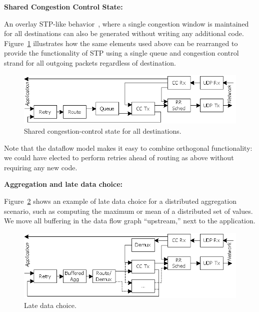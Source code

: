 \documentclass[10pt,twocolumn]{article}
\renewcommand{\subsection}[1]{\vspace{10pt}\noindent\textbf{#1:}\vspace{5pt}}
\begin{document}
\subsection{Shared Congestion Control State}

An overlay STP-like behavior~\cite{dabek_nsdi04}, where a single
congestion window is maintained for all destinations can also be
generated without writing any additional code.  Figure~\ref{fig:STP}
illustrates how the same elements used above can be rearranged to
provide the functionality of STP using a single queue and congestion
control strand for all outgoing packets regardless of destination.

\begin{figure}
\centerline{\includegraphics{STP}}
\caption{Shared congestion-control state for all destinations.}
\label{fig:STP}
\end{figure}

Note that the dataflow model makes it easy to combine orthogonal
functionality: we could have elected to perform retries ahead of
routing as above without requiring any new code. 

\subsection{Aggregation and late data choice}

Figure~\ref{fig:BufferedAggregation} shows an example of late data
choice for a distributed aggregation scenario, such as computing
the maximum or mean of a distributed set of values.  We move all
buffering in the data flow graph ``upstream,'' next to the
application. 

\begin{figure}
\centerline{\includegraphics{BufferedAggregationRetries}}
\caption{Late data choice.}
\label{fig:BufferedAggregation}
\end{figure}
\end{document}
